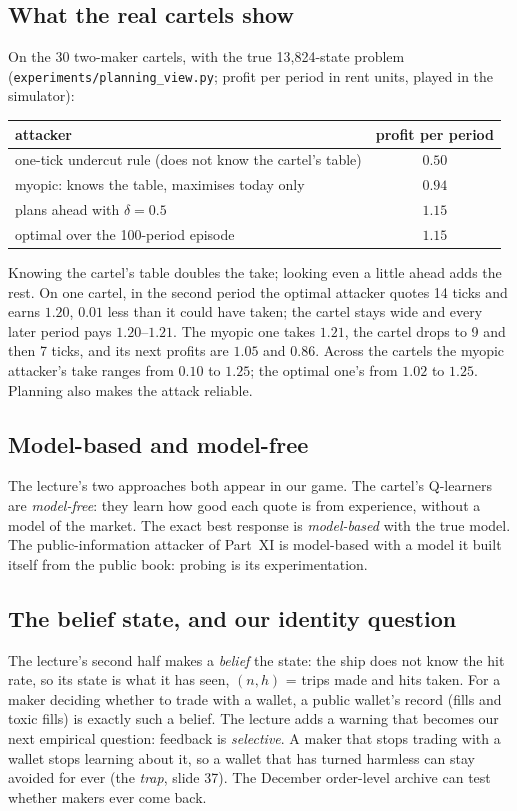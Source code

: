 \documentclass[11pt]{article}
\begin{document}
\subsection{What the real cartels show}
On the 30 two-maker cartels, with the true 13{,}824-state problem (\texttt{experiments/planning\_view.py};
profit per period in rent units, played in the simulator):
\begin{center}
\begin{tabular}{lc}
\toprule
attacker & profit per period \\
\midrule
one-tick undercut rule (does not know the cartel's table) & $0.50$ \\
myopic: knows the table, maximises today only & $0.94$ \\
plans ahead with $\delta=0.5$ & $1.15$ \\
optimal over the 100-period episode & $1.15$ \\
\bottomrule
\end{tabular}
\end{center}
Knowing the cartel's table doubles the take; looking even a little ahead adds the rest. On one cartel,
in the second period the optimal attacker quotes 14 ticks and earns $1.20$, $0.01$ less than it could
have taken; the cartel stays wide and every later period pays $1.20$--$1.21$. The myopic one takes
$1.21$, the cartel drops to 9 and then 7 ticks, and its next profits are $1.05$ and $0.86$. Across the
cartels the myopic attacker's take ranges from $0.10$ to $1.25$; the optimal one's from $1.02$ to $1.25$.
Planning also makes the attack reliable.

\subsection{Model-based and model-free}
The lecture's two approaches both appear in our game. The cartel's Q-learners are \emph{model-free}:
they learn how good each quote is from experience, without a model of the market. The exact best
response is \emph{model-based} with the true model. The public-information attacker of Part~XI is
model-based with a model it built itself from the public book: probing is its experimentation.

\subsection{The belief state, and our identity question}
The lecture's second half makes a \emph{belief} the state: the ship does not know the hit rate, so its
state is what it has seen, $(n,h)$ = trips made and hits taken. For a maker deciding whether to trade with
a wallet, a public wallet's record (fills and toxic fills) is exactly such a belief. The lecture adds a
warning that becomes our next empirical question: feedback is \emph{selective}. A maker that stops trading
with a wallet stops learning about it, so a wallet that has turned harmless can stay avoided for ever (the
\emph{trap}, slide 37). The December order-level archive can test whether makers ever come back.
\end{document}
